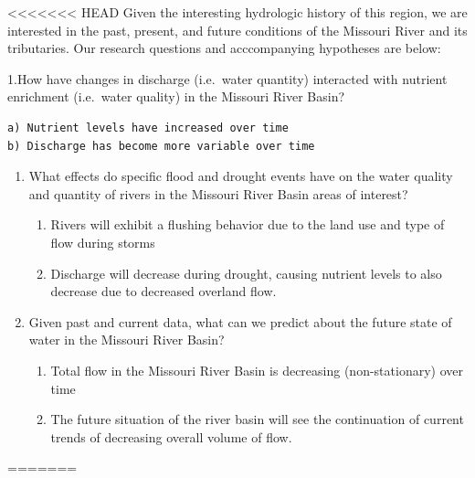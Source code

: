 \documentclass[12pt,]{article}
\providecommand{\tightlist}{%
  \setlength{\itemsep}{0pt}\setlength{\parskip}{0pt}}
\begin{document}
\textless\textless\textless\textless\textless\textless\textless{} HEAD
Given the interesting hydrologic history of this region, we are
interested in the past, present, and future conditions of the Missouri
River and its tributaries. Our research questions and acccompanying
hypotheses are below:

1.How have changes in discharge (i.e.~water quantity) interacted with
nutrient enrichment (i.e.~water quality) in the Missouri River Basin?

\begin{verbatim}
a) Nutrient levels have increased over time
b) Discharge has become more variable over time
\end{verbatim}

\begin{enumerate}
\def\labelenumi{\arabic{enumi}.}
\setcounter{enumi}{1}
\item
  What effects do specific flood and drought events have on the water
  quality and quantity of rivers in the Missouri River Basin areas of
  interest?

  \begin{enumerate}
  \def\labelenumii{\alph{enumii})}
  \tightlist
  \item
    Rivers will exhibit a flushing behavior due to the land use and type
    of flow during storms
  \item
    Discharge will decrease during drought, causing nutrient levels to
    also decrease due to decreased overland flow.
  \end{enumerate}
\item
  Given past and current data, what can we predict about the future
  state of water in the Missouri River Basin?

  \begin{enumerate}
  \def\labelenumii{\alph{enumii})}
  \tightlist
  \item
    Total flow in the Missouri River Basin is decreasing
    (non-stationary) over time
  \item
    The future situation of the river basin will see the continuation of
    current trends of decreasing overall volume of flow.
  \end{enumerate}
\end{enumerate}

=======
\end{document}
